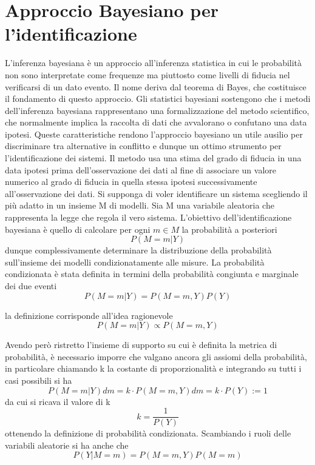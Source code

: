 \documentclass[10pt,a4paper,oneside,openany,noindent]{book}
\begin{document}
\section{Approccio Bayesiano per l’identificazione}
L’inferenza bayesiana è un approccio all’inferenza statistica in cui le probabilità
non sono interpretate come frequenze ma piuttosto come livelli di fiducia nel verificarsi di un dato evento. Il nome deriva dal teorema di Bayes, che costituisce il
fondamento di questo approccio. Gli statistici bayesiani sostengono che i metodi
dell’inferenza bayesiana rappresentano una formalizzazione del metodo scientifico,
che normalmente implica la raccolta di dati che avvalorano o confutano una data
ipotesi.
Queste caratteristiche rendono l’approccio bayesiano un utile ausilio per discriminare tra alternative in conflitto e dunque un ottimo strumento per l’identificazione
dei sistemi.
Il metodo usa una stima del grado di fiducia in una data ipotesi prima dell’osservazione
dei dati al fine di associare un valore numerico al grado di fiducia in quella stessa
ipotesi successivamente all’osservazione dei dati. Si supponga di voler identificare
un sistema scegliendo il più adatto in un insieme M di modelli.
Sia M una variabile aleatoria che rappresenta la legge che regola il vero sistema.
L’obiettivo dell’identificazione bayesiana è quello di calcolare per ogni $m\in M$ la
probabilità a posteriori
\begin{equation} P (M = m|Y )
\end{equation}
dunque complessivamente determinare la distribuzione della probabilità sull’insieme
dei modelli condizionatamente alle misure.
La probabilità condizionata è stata definita in termini della probabilità congiunta e
marginale dei due eventi
\begin{equation}
P (M = m|Y ) =
P (M = m, Y )
P (Y )
\end{equation}

la definizione corrisponde all’idea ragionevole
\begin{equation}
P (M = m|Y ) \propto P (M = m, Y )
\end{equation}

Avendo però ristretto l’insieme di supporto su cui è definita la metrica di probabilità,
è necessario imporre che valgano ancora gli assiomi della probabilità, in particolare
chiamando k la costante di proporzionalità e integrando su tutti i casi possibili si ha
\begin{equation}P (M = m|Y )dm =
k \cdot P (M = m, Y )dm = k \cdot P (Y ) := 1\end{equation}
da cui si ricava il valore di k
\begin{equation}k =
\frac{1}{P(Y)}
\end{equation}
ottenendo la definizione di probabilità condizionata.
Scambiando i ruoli delle variabili aleatorie si ha anche che
\begin{equation}
P (Y |M = m) =
P (M = m, Y )
P (M = m)
\end{equation}
\end{document}
